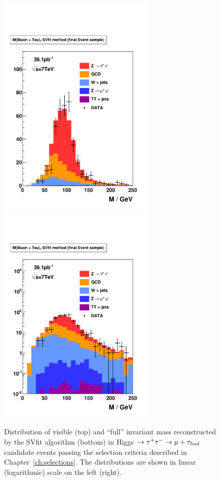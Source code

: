 \begin{figure}[t]
\begin{center}
\includegraphics*[width=75mm]{results_chapter/figures/results_loose/plotAHtoMuTauOS_woBtag_finalSamplePlots_mSVmethod_linear.pdf}
\includegraphics*[width=75mm]{results_chapter/figures/results_loose/plotAHtoMuTauOS_woBtag_finalSamplePlots_mSVmethod_log.pdf}
\caption[Distributions of final selected events]{Distribution of visible (top)
and ``full'' \TT invariant mass reconstructed by the SVfit algorithm (bottom) in
Higgs $\to \tau^+\tau^- \to \mu + \tau_{had}$ candidate events passing the selection
criteria described in Chapter~\ref{ch:selections}.  The distributions are shown
in linear (logarithmic) scale on the left (right).}
\label{fig:AHtoMuTauPlotsLoose}
\end{center}
\end{figure} 

